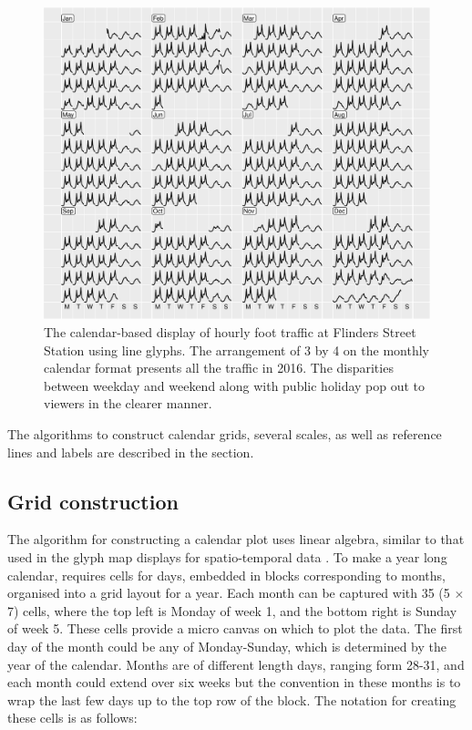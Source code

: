 \documentclass[article]{jss}
\begin{document}
\begin{CodeChunk}
\begin{figure}

{\centering \includegraphics[width=\textwidth]{figure/flinders-2016-1} 

}

\caption[The calendar-based display of hourly foot traffic at Flinders Street Station using line glyphs]{The calendar-based display of hourly foot traffic at Flinders Street Station using line glyphs. The arrangement of 3 by 4 on the monthly calendar format presents all the traffic in 2016. The disparities between weekday and weekend along with public holiday pop out to viewers in the clearer manner.}\label{fig:flinders-2016}
\end{figure}
\end{CodeChunk}

The algorithms to construct calendar grids, several scales, as well as
reference lines and labels are described in the section.

\subsection{Grid construction}\label{grid-construction}

\label{sec:grid}

The algorithm for constructing a calendar plot uses linear algebra,
similar to that used in the glyph map displays for spatio-temporal data
\citep{Wickham2012glyph}. To make a year long calendar, requires cells
for days, embedded in blocks corresponding to months, organised into a
grid layout for a year. Each month can be captured with 35 (5 \(\times\)
7) cells, where the top left is Monday of week 1, and the bottom right
is Sunday of week 5. These cells provide a micro canvas on which to plot
the data. The first day of the month could be any of Monday-Sunday,
which is determined by the year of the calendar. Months are of different
length days, ranging form 28-31, and each month could extend over six
weeks but the convention in these months is to wrap the last few days up
to the top row of the block. The notation for creating these cells is as
follows:
\end{document}
